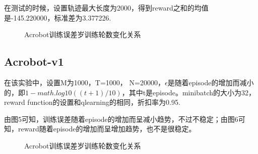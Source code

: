 \documentclass[a4paper,UTF8]{article}
\theoremstyle{definition}
\begin{document}
在测试的时候，设置轨迹最大长度为2000，得到reward之和的均值是-145.220000，标准差为3.377226.

\begin{figure}[htb]
    \caption{\label{Acrobot:1} Acrobot训练误差岁训练轮数变化关系}
    \end{figure}

\subsection*{Acrobot-v1}
在该实验中，设置M为1000，T=1000， N=20000，$\epsilon$是随着episode的增加而减小的，即$1-math.log10((t+1)/10)$，其中t是episode。minibatch的大小为32，reward function的设置和qlearning的相同，折扣率为0.95.

由图5可知，训练误差随着episode的增加而呈减小趋势，不过不稳定；由图6可知，reward随着episode的增加而呈增加趋势，也不是很稳定。

\begin{figure}[htb]
    \caption{\label{Acrobot:2} Acrobot训练误差岁训练轮数变化关系}
    \end{figure}
\end{document}
